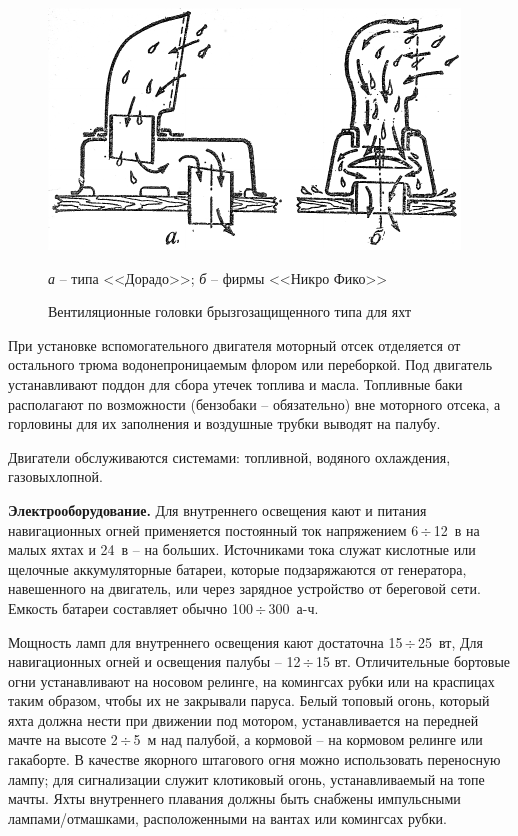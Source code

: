 \documentclass[a4paper, 12pt, twoside, final, book, russian, fittopage, cyremdash]{ncc}
\newcommand{\otdo}{\,\ensuremath{\div}\,}
\begin{document}
\begin{figure}[htb]
  \centering
  \includegraphics[scale=1.2]{0038P}
  \caption{Вентиляционные головки брызгозащищенного типа для яхт}
  \label{fig:38}
  \small
  \centering{}
  \textit{а} \--- типа <<Дорадо>>; \textit{б} \--- фирмы <<Никро Фико>>
\end{figure}

При установке вспомогательного двигателя моторный отсек отделяется от остального трюма водонепроницаемым флором или переборкой. Под двигатель устанавливают поддон для сбора утечек топлива и масла. Топливные баки располагают по возможности (бензобаки \--- обязательно) вне моторного отсека, а горловины для их заполнения и воздушные трубки выводят на палубу. 

Двигатели обслуживаются системами: топливной, водяного охлаждения, газовыхлопной. 

\textbf{Электрооборудование.} Для внутреннего освещения кают и питания навигационных огней применяется постоянный ток напряжением 6\otdo 12~в на малых яхтах и 24~в \--- на больших. Источниками тока служат кислотные или щелочные аккумуляторные батареи, которые подзаряжаются от генератора, навешенного на двигатель, или через зарядное устройство от береговой сети. Емкость батареи составляет обычно 100\otdo 300~а-ч. 

Мощность ламп для внутреннего освещения кают достаточна 15\otdo 25~вт, Для навигационных огней и освещения палубы \--- 12\otdo 15 вт. Отличительные бортовые огни устанавливают на носовом релинге, на комингсах рубки или на краспицах таким образом, чтобы их не закрывали паруса. Белый топовый огонь, который яхта должна нести при движении под мотором, устанавливается на передней мачте на высоте 2\otdo 5~м над палубой, а кормовой \--- на кормовом релинге или гакаборте. В качестве якорного штагового огня можно использовать переносную лампу; для сигнализации служит клотиковый огонь, устанавливаемый на топе мачты. Яхты внутреннего плавания должны быть снабжены импульсными лампами\-/отмашками, расположенными на вантах или комингсах рубки. 
\end{document}
